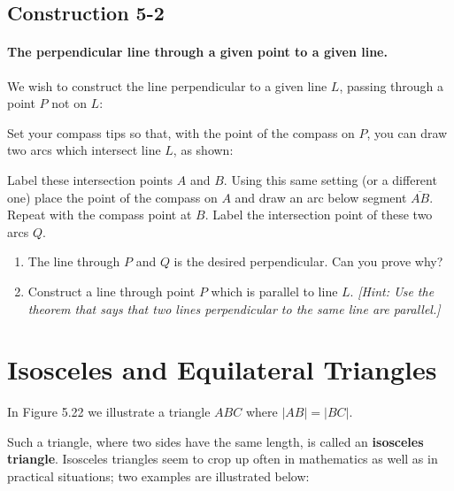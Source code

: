 \documentclass[12pt]{book} %
\begin{document}
\subsection*{Construction 5-2}

\paragraph{The perpendicular line through a given point to a given line.}

We wish to construct the line perpendicular to a given line $L$, passing through a point $P$ not on $L$:


Set your compass tips so that, with the point of the compass on $P$, you can draw two arcs which intersect line $L$, as shown:


Label these intersection points $A$ and $B$. Using this same setting (or a different one) place the point of the compass on $A$ and draw an arc below segment $\overline{AB}$. Repeat with the compass point at $B$. Label the intersection point of these two arcs $Q$.


\begin{enumerate}
\item The line through $P$ and $Q$ is the desired perpendicular. Can you prove why?

\item Construct a line through point $P$ which is parallel to line $L$. \textit{[Hint: Use the theorem that says that two lines perpendicular to the same line are parallel.]}

\end{enumerate}

\section{Isosceles and Equilateral Triangles}

In Figure 5.22 we illustrate a triangle $ABC$ where $|AB|=|BC|$.


Such a triangle, where two sides have the same length, is called an \textbf{isosceles triangle}. Isosceles triangles seem to crop up often in mathematics as well as in practical situations; two examples are illustrated below:
\end{document}
